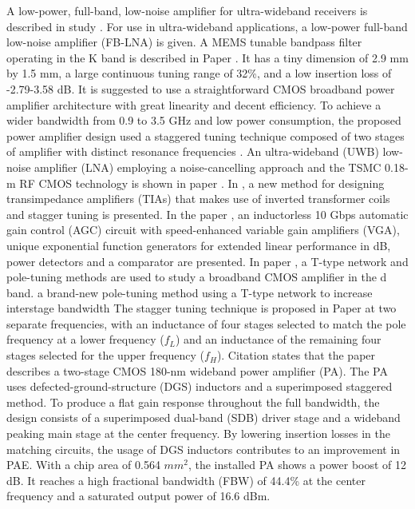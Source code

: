 A low-power, full-band, low-noise amplifier for ultra-wideband receivers is described in study \cite{5497167}. For use in ultra-wideband applications, a low-power full-band low-noise amplifier (FB-LNA) is given. A MEMS tunable bandpass filter operating in the K band is described in Paper \cite{5728610}. It has a tiny dimension of 2.9 mm by 1.5 mm, a large continuous tuning range of 32\%, and a low insertion loss of -2.79-3.58 dB. It is suggested to use a straightforward CMOS broadband power amplifier architecture with great linearity and decent efficiency. To achieve a wider bandwidth from 0.9 to 3.5 GHz and low power consumption, the proposed power amplifier design used a staggered tuning technique composed of two stages of amplifier with distinct resonance frequencies \cite{sapawl2012}. An ultra-wideband (UWB) low-noise amplifier (LNA) employing a noise-cancelling approach and the TSMC 0.18-m RF CMOS technology is shown in paper \cite{shim2013}. In \cite{7202869}, a new method for designing transimpedance amplifiers (TIAs) that makes use of inverted transformer coils and stagger tuning is presented. In the paper \cite{7348667}, an inductorless 10 Gbps automatic gain control (AGC) circuit with speed-enhanced variable gain amplifiers (VGA), unique exponential function generators for extended linear performance in dB, power detectors and a comparator are presented. In paper \cite{8400821}, a T-type network and pole-tuning methods are used to study a broadband CMOS amplifier in the d band. a brand-new pole-tuning method using a T-type network to increase interstage bandwidth The stagger tuning technique is proposed in Paper \cite{8939351} at two separate frequencies, with an inductance of four stages selected to match the pole frequency at a lower frequency ($f_L$) and an inductance of the remaining four stages selected for the upper frequency ($f_H$). Citation \cite{9829838} states that the paper describes a two-stage CMOS 180-nm wideband power amplifier (PA). The PA uses defected-ground-structure (DGS) inductors and a superimposed staggered method. To produce a flat gain response throughout the full bandwidth, the design consists of a superimposed dual-band (SDB) driver stage and a wideband peaking main stage at the center frequency. By lowering insertion losses in the matching circuits, the usage of DGS inductors contributes to an improvement in PAE. With a chip area of 0.564 ${mm}^2$, the installed PA shows a power boost of 12 dB. It reaches a high fractional bandwidth (FBW) of 44.4\% at the center frequency and a saturated output power of 16.6 dBm.
